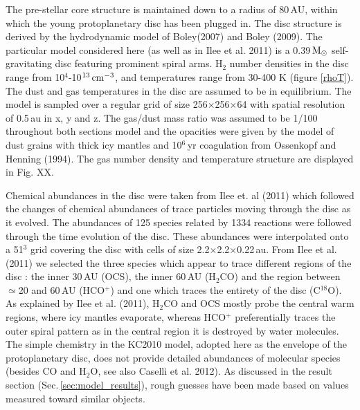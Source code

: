 \documentclass[useAMS,usenatbib]{mn2e}
\begin{document}
The pre-stellar core structure is maintained down to a radius of 80\,AU, within which the young protoplanetary disc has been plugged in. The disc structure is derived by the hydrodynamic model of Boley(2007) and Boley (2009). The particular model considered here (as well as in Ilee et al. 2011) is a 0.39$\,\rm{M}_\odot$ self-gravitating disc featuring prominent spiral arms. H$_2$ number densities in the disc range from 10$^{4}$-10$^{13}\,\rm{cm}^{-3}$, and temperatures range from 30-400 K (figure \ref{rhoT}). The dust and gas temperatures in the disc are assumed to be in equilibrium. The model is sampled over a regular grid of size 256$\times$256$\times$64 with spatial resolution of 0.5$\,$au in x, y and z. The gas/dust mass ratio was assumed to be 1/100 throughout both sections model and the opacities were given by the model of dust grains with thick icy mantles and 10$^6\,$yr coagulation from Ossenkopf and Henning (1994). The gas number density and temperature structure are displayed in Fig. XX. \newline


Chemical abundances in the disc were taken from Ilee et. al (2011) which followed the changes of chemical abundances of trace particles moving through the disc as it evolved. The abundances of 125 species related by 1334 reactions were followed through the time evolution of the disc. These abundances were interpolated onto a 51$^3$ grid covering the disc with cells of size 2.2$\times$2.2$\times$0.22$\,$au.  From Ilee et al. (2011) we selected the three species which appear to trace different regions of the disc : the inner 30\,AU (OCS), the inner 60\,AU (H$_2$CO) and the region between $\simeq$20 and 60\,AU (HCO$^+$) and one which traces the entirety of the disc (C$^{18}$O). As explained by Ilee et al. (2011),  H$_2$CO and OCS mostly probe the central warm regions, where icy mantles evaporate, whereas HCO$^+$ preferentially traces the outer spiral pattern as in the central region it is destroyed by water molecules. The simple chemistry in the KC2010 model, adopted here as the envelope of the protoplanetary disc, does not provide detailed abundances of molecular species (besides CO and H$_2$O, see also Caselli et al. 2012). As discussed in the result section (Sec.\,\ref{sec:model_results}), rough guesses have been made based on values measured toward similar objects. 
\end{document}
